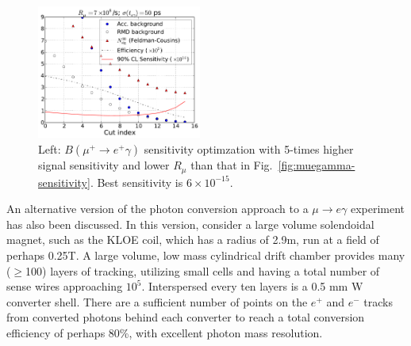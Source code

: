 \begin{figure}[htbp]
\centering
\includegraphics[width=0.48\textwidth]{Figures/muegamma-sens-7e8-1p5y-50ps-x5sigeff.pdf}
\caption{Left: $B(\mu^+\to e^+\gamma)$ sensitivity optimzation with 5-times
higher signal sensitivity and lower $R_\mu$ than that in 
Fig.~\ref{fig:muegamma-sensitivity}. Best sensitivity is $6\times 10^{-15}$.}
\label{fig:muegamma-sens-5x}
\end{figure}


An alternative version of the photon conversion approach to a $\mu \to e \gamma$ 
experiment has also been discussed. In this version, consider a large volume
solendoidal magnet, such as the KLOE coil, which has a radius of 2.9m, run at a
field of perhaps 0.25T. A large volume, low mass cylindrical drift chamber 
provides many ($\ge$100) layers of tracking, utilizing small cells and having 
a total number of sense wires approaching $10^5$. Interspersed every ten layers 
is a 0.5 mm W converter shell. There are a sufficient number of points on the 
$e^+$ and $e^-$ tracks from converted photons behind each converter to reach a
 total conversion efficiency of perhaps 80\%, with excellent photon mass 
resolution. 

